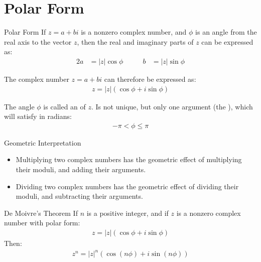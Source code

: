 \documentclass[\main/notes.tex]{subfiles}
\begin{document}
		\section{Polar Form}
			\begin{definition}{Polar Form}
				If $z = a + bi$ is a nonzero complex number, and $\phi$ is an angle from the real axis to the vector $z$, then the real and imaginary parts of $z$ can be expressed as:
				\begin{alignat*}{2}
					a &= \left\lvert z\right\rvert \cos \phi & \qquad b &= \left\lvert z\right\rvert \sin \phi
				\end{alignat*}

				The complex number $z = a + bi$ can therefore be expressed as:
				\begin{align*}
					z = \left\lvert z\right\rvert (\cos \phi + i \sin \phi)
				\end{align*}

				The angle $\phi$ is called an  of $z$. Is not unique, but only one argument (the ), which will satisfy in radians:
				\begin{align*}
					- \pi < \phi \leq \pi
				\end{align*}
			\end{definition}
			\begin{sidenote}{Geometric Interpretation}
				\begin{itemize}
					\item Multiplying two complex numbers has the geometric effect of multiplying their moduli, and adding their arguments.
					\item Dividing two complex numbers has the geometric effect of dividing their moduli, and subtracting their arguments.
				\end{itemize}
			\end{sidenote}
			\begin{theorem}{De Moivre's Theorem}
				If $n$ is a positive integer, and if $z$ is a nonzero complex number with polar form:
				\begin{align*}
					z = \left\lvert z\right\rvert (\cos \phi + i \sin \phi)
				\end{align*}
				Then:
				\begin{align*}
					z^{n} = \left\lvert z\right\rvert^{n} (\cos (n \phi) + i \sin (n \phi)) 
				\end{align*}
			\end{theorem}
\end{document}

